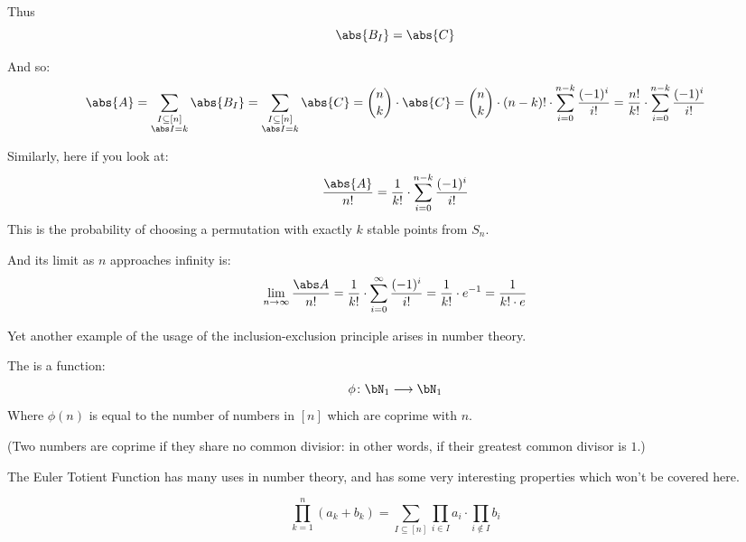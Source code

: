 \begin{blankpp}
	Thus
	\[ \abs{B_I} = \abs{C} \]

	And so:
	\[ \abs{A} = \sum_{\substack{I\subseteq[n]\\\abs I=k}}\abs{B_I} = \sum_{\substack{I\subseteq[n]\\\abs I=k}}\abs{C}
	   = \binom nk\cdot\abs{C} = \binom nk\cdot(n-k)!\cdot\sum_{i=0}^{n-k}\frac{(-1)^i}{i!} =
	   \frac{n!}{k!}\cdot\sum_{i=0}^{n-k}\frac{(-1)^i}{i!} \]

\end{blankpp}

\begin{note}

	Similarly, here if you look at:
	\[ \frac{\abs{A}}{n!} = \frac1{k!}\cdot\sum_{i=0}^{n-k}\frac{(-1)^i}{i!} \]
	This is the probability of choosing a permutation with exactly $k$ stable points from $S_n$.

	And its limit as $n$ approaches infinity is:
	\[ \lim_{n\to\infty}\frac{\abs A}{n!} = \frac1{k!}\cdot\sum_{i=0}^\infty\frac{(-1)^i}{i!} = \frac1{k!}\cdot e^{-1}
	= \frac{1}{k!\cdot e} \]

\end{note}

Yet another example of the usage of the inclusion-exclusion principle arises in number theory.

\begin{defn}

	The  is a function:
	\[ \phi\colon\bN_1\longrightarrow\bN_1 \]
	Where $\phi(n)$ is equal to the number of numbers in $[n]$ which are coprime with $n$.

	(Two numbers are coprime if they share no common divisior: in other words, if their greatest common divisor is $1$.)

\end{defn}

The Euler Totient Function has many uses in number theory, and has some very interesting properties which won't 
be covered here.

\begin{lemm}

	\[ \prod_{k=1}^n(a_k+b_k) = \sum_{I\subseteq[n]}\prod_{i\in I}a_i\cdot\prod_{i\notin I}b_i \]

\end{lemm}

